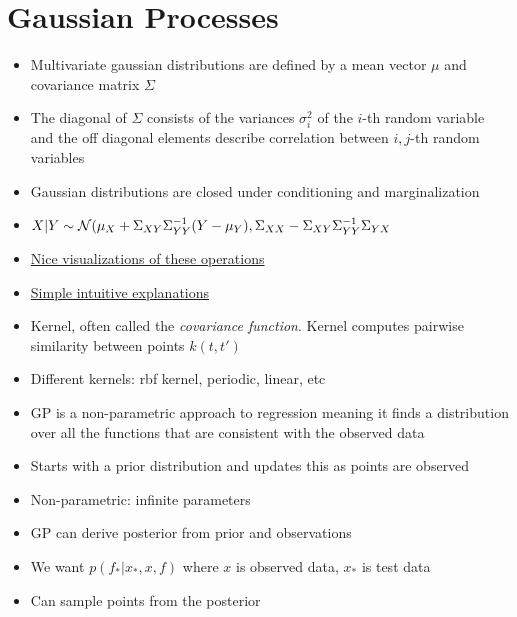 \documentclass[../main.tex]{subfiles}
\begin{document}
\section{Gaussian Processes}
  \begin{itemize}
    \item Multivariate gaussian distributions are defined by a mean vector $\mu$ and covariance matrix $\Sigma$
    \item The diagonal of $\Sigma$ consists of the variances $\sigma_{i}^{2}$ of the $i$-th random variable and the off diagonal elements describe correlation between $i,j$-th random variables
    \item Gaussian distributions are closed under conditioning and marginalization
    \item $X|Y \sim \mathcal{N}(\mu_{X} + \Sigma_{XY}\Sigma_{YY}^{-1}(Y-\mu_{Y}), \Sigma_{XX} - \Sigma_{XY}\Sigma_{YY}^{-1}\Sigma_{YX}$
    \item \href{https://distill.pub/2019/visual-exploration-gaussian-processes/}{Nice visualizations of these operations}
    \item \href{https://katbailey.github.io/post/gaussian-processes-for-dummies/}{Simple intuitive explanations}
    \item Kernel, often called the \textit{covariance function}. Kernel computes pairwise similarity between points $k(t, t')$
    \item Different kernels: rbf kernel, periodic, linear, etc
    \item GP is a non-parametric approach to regression meaning it finds a distribution over all the functions that are consistent with the observed data
    \item Starts with a prior distribution and updates this as points are observed
    \item Non-parametric: infinite parameters
    \item GP can derive posterior from prior and observations
    \item We want $p(f_{*}|x_{*}, x, f)$ where $x$ is observed data, $x_{*}$ is test data
    \item Can sample points from the posterior
  \end{itemize}
\end{document}
